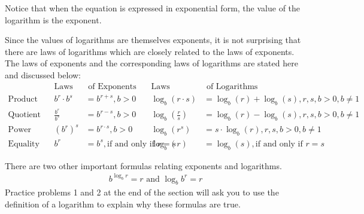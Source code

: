 \documentclass[10pt,]{book}
\theoremstyle{ptxdefinitionnotitle}
\theoremstyle{ptxdefinitiontitle}
\theoremstyle{ptxdefinitionnotitle}
\theoremstyle{ptxdefinitiontitle}
\theoremstyle{ptxdefinitionnotitle}
\theoremstyle{ptxdefinitiontitle}
\numberwithin{equation}{section}
\newcommand{\amp}{&}
\begin{document}
\hypertarget{p-286}{}%
Notice that when the equation is expressed in exponential form, the value of the logarithm is the exponent.%
\par
\hypertarget{p-287}{}%
Since the values of logarithms are themselves exponents, it is not surprising that there are laws of logarithms which are closely related to the laws of exponents.  The laws of exponents and the corresponding laws of logarithms are stated here and discussed below:%
\begin{align*}
\text{} \amp \amp \text{Laws} \amp \text{ of Exponents} \amp \text{Laws} \amp \text{ of Logarithms}\\
\text{Product} \amp \amp b^r \cdot b^s \amp = b^{r+s}, b>0 \amp \log_b\left(r \cdot s\right) \amp = \log_b(r) + \log_b(s), r, s, b > 0, b \neq 1\\
\text{Quotient} \amp \amp \frac{b^r}{b^s} \amp = b^{r-s}, b>0 \amp \log_b\left( \frac{r}{s} \right) \amp = \log_b(r) - \log_b(s), r, s, b > 0, b \neq 1\\
\text{Power} \amp \amp \left( b^r \right) ^ s \amp = b^{r \cdot s}, b>0 \amp \log_b\left(r ^ s\right) \amp = s \cdot \log_b(r), r, s, b > 0, b \neq 1\\
\text{Equality} \amp \amp b^r \amp = b^s, \text{if and only if } r = s \amp \log_b\left( r \right) \amp = \log_b\left( s \right), \text{if and only if } r = s
\end{align*}
%
\par
\hypertarget{p-288}{}%
There are two other important formulas relating exponents and logarithms.%
\begin{gather*}
b ^ {\log_b r} = r \text{ and } \log_b b^r = r
\end{gather*}
Practice problems 1 and 2 at the end of the section will ask you to use the definition of a logarithm to explain why these formulas are true.%
\end{document}
